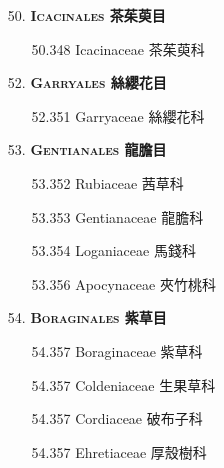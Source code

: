 \begin{enumerate}
  \item[50. ] \textbf{\textsc{Icacinales} 茶茱萸目}   
    \begin{enumerate}
      \item[50.348] Icacinaceae 茶茱萸科     
        
    \end{enumerate}
  \item[52. ] \textbf{\textsc{Garryales} 絲纓花目}   
    \begin{enumerate}
      \item[52.351] Garryaceae 絲纓花科     
        
    \end{enumerate}
  \item[53. ] \textbf{\textsc{Gentianales} 龍膽目}   
    \begin{enumerate}
      \item[53.352] Rubiaceae 茜草科     
        
      \item[53.353] Gentianaceae 龍膽科     
        
      \item[53.354] Loganiaceae 馬錢科     
        
      \item[53.356] Apocynaceae 夾竹桃科     
        
    \end{enumerate}
  \item[54. ] \textbf{\textsc{Boraginales} 紫草目}   
    \begin{enumerate}
      \item[54.357] Boraginaceae 紫草科     
        
      \item[54.357] Coldeniaceae 生果草科     
        
      \item[54.357] Cordiaceae 破布子科     
        
      \item[54.357] Ehretiaceae 厚殼樹科     
        

\end{enumerate}
\end{enumerate}
